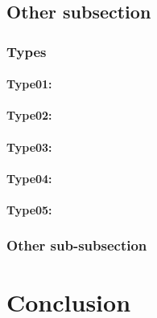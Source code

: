 	\subsection{Other subsection}
	
		\subsubsection{Types}
	\lipsum[1]

		 
			\paragraph{Type01:}
	\lipsum[1]

			\paragraph{Type02:}
				\lipsum[1]
		
			\paragraph{Type03:}
	\lipsum[1]
			\paragraph{Type04:}
				\lipsum[1]
		
			\paragraph{Type05:}
	\lipsum[1]
		\subsubsection{Other sub-subsection} 
		\lipsum[1]
	
		
		
\section{Conclusion}
	\lipsum[1]
		\lipsum[1]
			\lipsum[1]